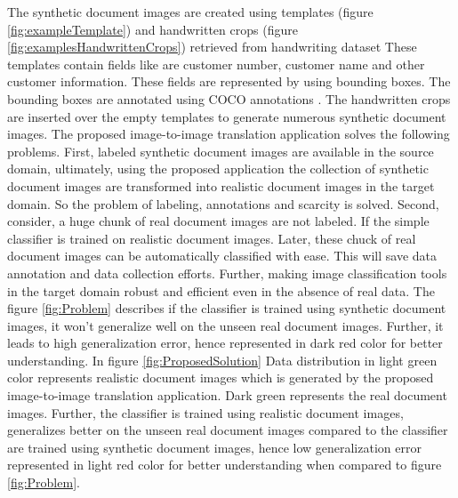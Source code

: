 
The synthetic document images are created using templates (figure \ref{fig:exampleTemplate}) and handwritten crops (figure \ref{fig:examplesHandwrittenCrops}) retrieved from handwriting dataset These templates contain fields like are customer number, customer name and other customer information. These fields are represented by using bounding boxes. The bounding boxes are annotated using \ac{COCO} annotations \cite{10.1007/978-3-319-10602-1_48}. The handwritten crops are inserted over the empty templates to generate numerous synthetic document images. The proposed image-to-image translation application solves the following problems. First, labeled synthetic document images are available in the source domain, ultimately, using the proposed application the collection of synthetic document images are transformed into realistic document images in the target domain. So the problem of labeling, annotations and scarcity is solved. Second, consider, a huge chunk of real document images are not labeled. If the simple classifier is trained on realistic document images. Later, these chuck of real document images can be automatically classified with ease. This will save data annotation and data collection efforts. Further, making image classification tools in the target domain robust and efficient even in the absence of real data. The figure \ref{fig:Problem} describes if the classifier is trained using synthetic document images, it won't generalize well on the unseen real document images. Further, it leads to high generalization error, hence represented in dark red color for better understanding. In figure \ref{fig:ProposedSolution} Data distribution in light green color represents realistic document images which is generated by the proposed image-to-image translation application. Dark green represents the real document images.  Further, the classifier is trained using realistic document images, generalizes better on the unseen real document images compared to the classifier are trained using synthetic document images, hence low generalization error represented in light red color for better understanding when compared to figure \ref{fig:Problem}.



